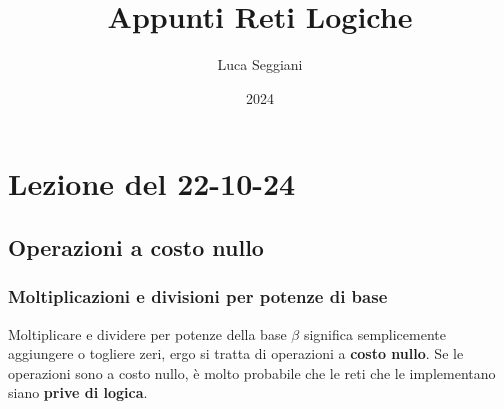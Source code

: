 \documentclass[a4paper,11pt]{article}
\title{Appunti Reti Logiche}
\author{Luca Seggiani}
\date{2024}
\begin{document}
\section{Lezione del 22-10-24}

\thispagestyle{empty}
\pagestyle{fancy}

\subsection{Operazioni a costo nullo}
\subsubsection{Moltiplicazioni e divisioni per potenze di base}
Moltiplicare e dividere per potenze della base $\beta$ significa semplicemente aggiungere o togliere zeri, ergo si tratta di operazioni a \textbf{costo nullo}.
Se le operazioni sono a costo nullo, è molto probabile che le reti che le implementano siano \textbf{prive di logica}.
\end{document}
